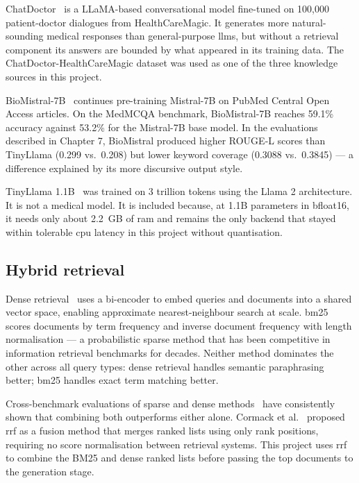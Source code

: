 ChatDoctor~\cite{li2023chatdoctor} is a LLaMA-based conversational model fine-tuned on 100,000 patient-doctor dialogues from HealthCareMagic. It generates more natural-sounding medical responses than general-purpose \ac{llm}s, but without a retrieval component its answers are bounded by what appeared in its training data. The ChatDoctor-HealthCareMagic dataset was used as one of the three knowledge sources in this project.

BioMistral-7B~\cite{labrak2024biomistral} continues pre-training Mistral-7B on PubMed Central Open Access articles. On the MedMCQA benchmark, BioMistral-7B reaches 59.1\% accuracy against 53.2\% for the Mistral-7B base model. In the evaluations described in Chapter 7, BioMistral produced higher ROUGE-L scores than TinyLlama (0.299 vs.\ 0.208) but lower keyword coverage (0.3088 vs.\ 0.3845) --- a difference explained by its more discursive output\allowbreak{} style.

TinyLlama 1.1B~\cite{zhang2024tinyllama} was trained on 3 trillion tokens using the Llama 2 architecture. It is not a medical model. It is included because, at 1.1B parameters in bfloat16, it needs only about 2.2~GB of \ac{ram} and remains the only backend that stayed within tolerable \ac{cpu} latency in this project without quantisation.

\subsection{Hybrid retrieval}

Dense retrieval~\cite{karpukhin2020dpr} uses a bi-encoder to embed queries and documents into a shared vector space, enabling approximate nearest-neighbour search at scale. \ac{bm25}~\cite{robertson2009bm25} scores documents by term frequency and inverse document frequency with length normalisation --- a probabilistic sparse method that has been competitive in information retrieval benchmarks for decades. Neither method dominates the other across all query types: dense retrieval handles semantic paraphrasing better; \ac{bm25} handles exact term matching better.

Cross-benchmark evaluations of sparse and dense methods~\cite{ma2022hybrid} have consistently shown that combining both outperforms either alone. Cormack et al.~\cite{cormack2009rrf} proposed \ac{rrf} as a fusion method that merges ranked lists using only rank positions, requiring no score normalisation between retrieval systems. This project uses \ac{rrf} to combine the BM25 and dense ranked lists before passing the top documents to the generation stage.

